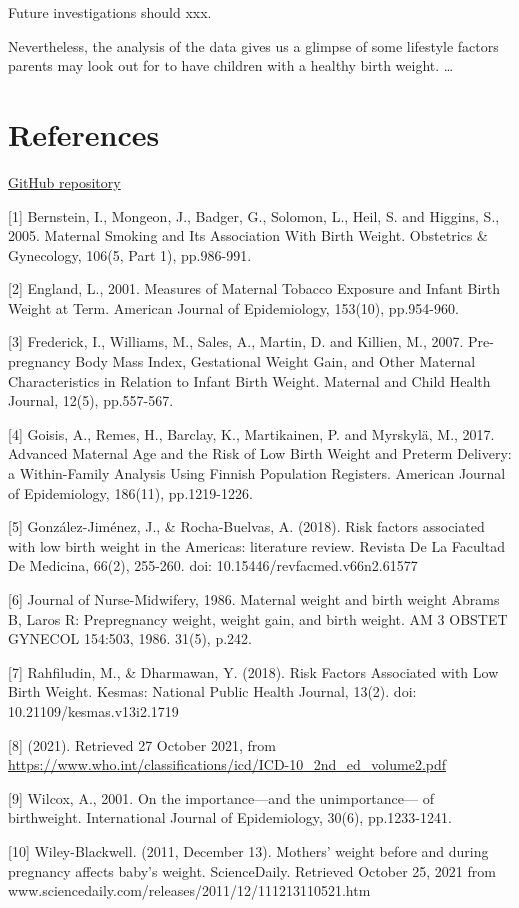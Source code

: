 \documentclass[9pt,twocolumn,twoside,]{pnas-new}
\begin{document}
Future investigations should xxx.

Nevertheless, the analysis of the data gives us a glimpse of some
lifestyle factors parents may look out for to have children with a
healthy birth weight. \ldots{}

\hypertarget{references}{%
\section*{References}\label{references}}

\href{https://github.sydney.edu.au/}{GitHub repository}

{[}1{]} Bernstein, I., Mongeon, J., Badger, G., Solomon, L., Heil, S.
and Higgins, S., 2005. Maternal Smoking and Its Association With Birth
Weight. Obstetrics \& Gynecology, 106(5, Part 1), pp.986-991.

{[}2{]} England, L., 2001. Measures of Maternal Tobacco Exposure and
Infant Birth Weight at Term. American Journal of Epidemiology, 153(10),
pp.954-960.

{[}3{]} Frederick, I., Williams, M., Sales, A., Martin, D. and Killien,
M., 2007. Pre-pregnancy Body Mass Index, Gestational Weight Gain, and
Other Maternal Characteristics in Relation to Infant Birth Weight.
Maternal and Child Health Journal, 12(5), pp.557-567.

{[}4{]} Goisis, A., Remes, H., Barclay, K., Martikainen, P. and
Myrskylä, M., 2017. Advanced Maternal Age and the Risk of Low Birth
Weight and Preterm Delivery: a Within-Family Analysis Using Finnish
Population Registers. American Journal of Epidemiology, 186(11),
pp.1219-1226.

{[}5{]} González-Jiménez, J., \& Rocha-Buelvas, A. (2018). Risk factors
associated with low birth weight in the Americas: literature review.
Revista De La Facultad De Medicina, 66(2), 255-260. doi:
10.15446/revfacmed.v66n2.61577

{[}6{]} Journal of Nurse-Midwifery, 1986. Maternal weight and birth
weight Abrams B, Laros R: Prepregnancy weight, weight gain, and birth
weight. AM 3 OBSTET GYNECOL 154:503, 1986. 31(5), p.242.

{[}7{]} Rahfiludin, M., \& Dharmawan, Y. (2018). Risk Factors Associated
with Low Birth Weight. Kesmas: National Public Health Journal, 13(2).
doi: 10.21109/kesmas.v13i2.1719

{[}8{]} (2021). Retrieved 27 October 2021, from
\url{https://www.who.int/classifications/icd/ICD-10_2nd_ed_volume2.pdf}

{[}9{]} Wilcox, A., 2001. On the importance---and the unimportance--- of
birthweight. International Journal of Epidemiology, 30(6), pp.1233-1241.

{[}10{]} Wiley-Blackwell. (2011, December 13). Mothers' weight before
and during pregnancy affects baby's weight. ScienceDaily. Retrieved
October 25, 2021 from
www.sciencedaily.com/releases/2011/12/111213110521.htm

\showmatmethods
\pnasbreak



% 
\end{document}

